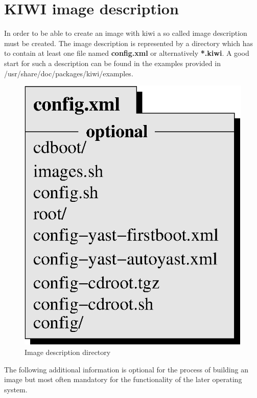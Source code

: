 \chapter{KIWI image description}
\label{chapter:description}
\minitoc

In order to be able to create an image with kiwi a so called
image description must be created. The image description is
represented by a directory which has to contain at least one
file named \textbf{config.xml} or alternatively \textbf{*.kiwi}.
A good start for such a description can be found in the examples
provided in /usr/share/doc/packages/kiwi/examples.

\begin{figure}[h]
\centering
\includegraphics[scale=0.5]{pictures/description.eps}
\caption{Image description directory}
\label{fig:description}
\end{figure}

The following additional information is optional for the process
of building an image but most often mandatory for the functionality
of the later operating system.

